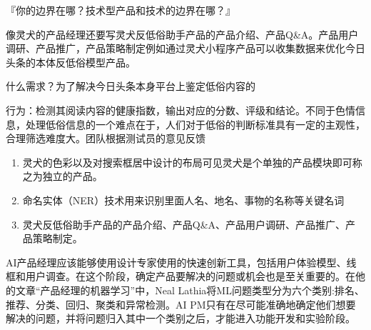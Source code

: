 \documentclass[letterpaper,11pt,english]{sphinxmanual}
\begin{document}
『你的边界在哪？技术型产品和技术的边界在哪？』

像灵犬的产品经理还要写灵犬反低俗助手产品的产品介绍、产品Q\&A。产品用户调研、产品推广，产品策略制定例如通过灵犬小程序产品可以收集数据来优化今日头条的本体反低俗模型产品。

什么需求？为了解决今日头条本身平台上鉴定低俗内容的

行为：检测其阅读内容的健康指数，输出对应的分数、评级和结论。不同于色情信息，处理低俗信息的一个难点在于，人们对于低俗的判断标准具有一定的主观性，合理筛选难度大。团队根据测试员的意见反馈
\begin{enumerate}
%
\item {} 
灵犬的色彩以及对搜索框居中设计的布局可见灵犬是个单独的产品模块即可称之为独立的产品。

\item {} 
命名实体（NER）技术用来识别里面人名、地名、事物的名称等关键名词

\item {} 
灵犬反低俗助手产品的产品介绍、产品Q\&A、产品用户调研、产品推广、产品策略制定。

\end{enumerate}

AI产品经理应该能够使用设计专家使用的快速创新工具，包括用户体验模型、线框和用户调查。在这个阶段，确定产品要解决的问题或机会也是至关重要的。在他的文章“产品经理的机器学习”中，Neal
Lathia将ML问题类型分为六个类别:排名、推荐、分类、回归、聚类和异常检测。AI
PM只有在尽可能准确地确定他们想要解决的问题，并将问题归入其中一个类别之后，才能进入功能开发和实验阶段。%
\begin{footnote}[243]\sphinxAtStartFootnote
{}
%
\end{footnote}
\end{document}
